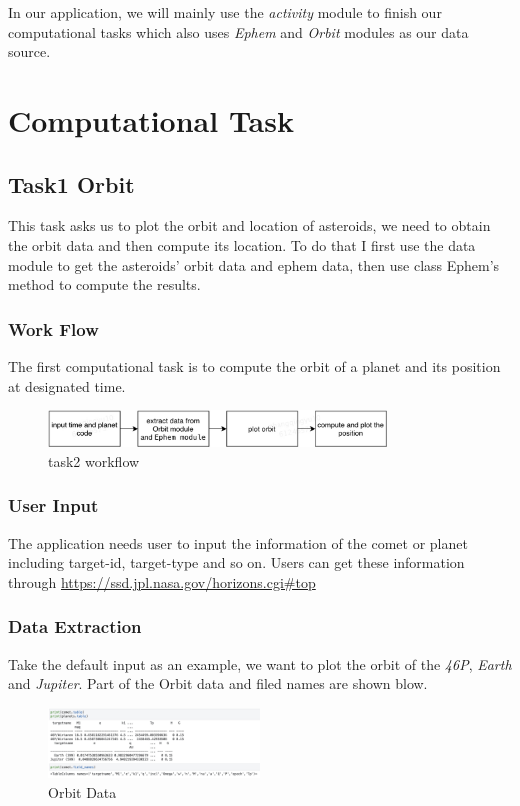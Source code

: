 \documentclass{report}
\begin{document}
In our application, we will mainly use the \emph{activity} module to finish our computational tasks which also uses \emph{Ephem} and \emph{Orbit} modules as our data source.

\chapter{Computational Task}
\section{Task1 Orbit}
This task asks us to plot the orbit and location of asteroids, we need to obtain the orbit data and then compute its location. To do that I first use the data module to get the asteroids' orbit data and ephem data, then use class Ephem's method to compute the results. 
\subsection{Work Flow}
The first computational task is to compute the orbit of a planet and its position at designated time.
\begin{figure}[htb]
    \centering
    \includegraphics[width=0.8\textwidth]{task1}
    \caption{task2 workflow}
    \label{fig:task2}
\end{figure}

\subsection{User Input}
The application needs user to input the information of the comet or planet including target-id, target-type and so on. Users can get these information through \url{https://ssd.jpl.nasa.gov/horizons.cgi#top}
\subsection{Data Extraction}
Take the default input as an example, we want to plot the orbit of the \emph{46P}, \emph{Earth} and \emph{Jupiter}.
Part of the Orbit data and filed names are shown blow.
\begin{figure}[htb]
    \centering
    \includegraphics[width=0.5\textwidth]{DataExtraction}
    \caption{Orbit Data}
    \label{fig:OrbitData}
\end{figure}
\end{document}
